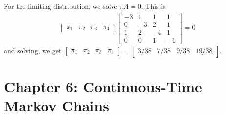 \documentclass{article}
\begin{document}
\begin{itemize}
\begin{enumerate}[(a)]
\begin{soln}
					For the limiting distribution, we solve $\pi A= 0.$ This is
					\begin{align*}
						\begin{bmatrix}
							\pi_1 & \pi_2 & \pi_3 & \pi_4
						\end{bmatrix} \begin{bmatrix}
							-3 & 1 & 1 & 1 \\
							0 & -3 & 2 & 1 \\
							1 & 2 & -4 & 1 \\
							0 & 0 & 1 & -1
						\end{bmatrix} = 0
					\end{align*}
					and solving, we get $\begin{bmatrix}
						\pi_1 & \pi_2 & \pi_3 & \pi_4
					\end{bmatrix} = \begin{bmatrix}
						3/38 & 7/38 & 9/38 & 19/38
					\end{bmatrix}.$
				\end{soln}
				
		\end{enumerate}

\end{itemize}

\section*{Chapter 6: Continuous-Time Markov Chains}
\end{document}
